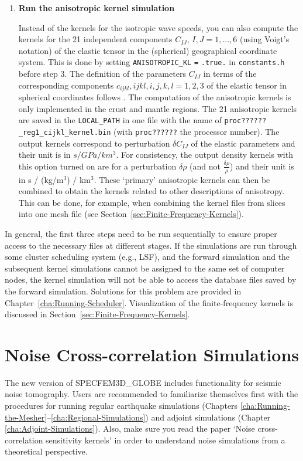 \documentclass[oneside,english]{book}
\begin{document}
\begin{enumerate}
\item \textbf{Run the anisotropic kernel simulation}


Instead of the kernels for the isotropic wave speeds, you can also
compute the kernels for the 21 independent components $C_{IJ},\, I,J=1,...,6$
(using Voigt's notation) of the elastic tensor in the (spherical)
geographical coordinate system. This is done by setting \texttt{ANISOTROPIC\_KL}
\texttt{=} \texttt{.true.} in \texttt{constants.h} before step 3.
The definition of the parameters $C_{IJ}$ in terms of the corresponding
components $c_{ijkl},ijkl,i,j,k,l=1,2,3$ of the elastic tensor in
spherical coordinates follows \citet{ChTr07}. The computation of
the anisotropic kernels is only implemented in the crust and mantle
regions. The 21 anisotropic kernels are saved in the \texttt{LOCAL\_PATH}
in one file with the name of \texttt{proc??????\_reg1\_cijkl\_kernel.bin}
(with \texttt{proc??????} the processor number). The output kernels
correspond to perturbation $\delta C_{IJ}$ of the elastic parameters
and their unit is in $s/GPa/km^{3}$. For consistency, the output
density kernels with this option turned on are for a perturbation
$\delta\rho$ (and not $\frac{\delta\rho}{\rho}$) and their unit
is in s / (kg/m$^{3}$) / km$^{3}$. These `primary' anisotropic kernels
can then be combined to obtain the kernels related to other descriptions
of anisotropy. This can be done, for example, when combining the kernel
files from slices into one mesh file (see Section~\ref{sec:Finite-Frequency-Kernels}).

\end{enumerate}
In general, the first three steps need to be run sequentially to ensure
proper access to the necessary files at different stages. If the simulations
are run through some cluster scheduling system (e.g., LSF), and the
forward simulation and the subsequent kernel simulations cannot be
assigned to the same set of computer nodes, the kernel simulation
will not be able to access the database files saved by the forward
simulation. Solutions for this problem are provided in Chapter~\ref{cha:Running-Scheduler}.
Visualization of the finite-frequency kernels is discussed in Section~\ref{sec:Finite-Frequency-Kernels}.


\chapter{Noise Cross-correlation Simulations}

The new version of SPECFEM3D\_GLOBE includes functionality for seismic noise tomography.
Users are recommended to familiarize themselves first with the procedures for running regular earthquake
simulations (Chapters \ref{cha:Running-the-Mesher}--\ref{cha:Regional-Simulations}) and
adjoint simulations (Chapter \ref{cha:Adjoint-Simulations}).
Also, make sure you read the paper `Noise cross-correlation sensitivity kernels' \citep{trompetal2010}
in order to understand noise simulations from a theoretical perspective.
\end{document}
